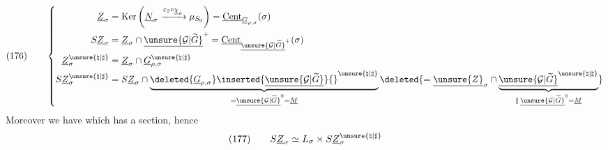\[
(176)\qquad
\left\{
\begin{aligned}
\underline Z_\sigma
&=\operatorname{Ker}\left(
\underline N_\sigma\xrightarrow{\varepsilon_2\circ\underline\chi_\sigma}\mu_{S_0}
\right)
=\underline{\operatorname{Cent}}_{\underline G_{\rho,\sigma}}(\sigma)\\
S\underline Z_\sigma
&=\underline Z_\sigma\cap\underline{\unsure{\mathcal G|\widetilde G}}^{+}
=\underline{\operatorname{Cent}}_{\underline{\unsure{\mathcal G|\widetilde G}}^{+}}(\sigma)\\
\underline Z_\sigma^{\unsure{\natural|\sharp}}
&=\underline Z_\sigma\cap\underline G_{\rho,\sigma}^{\unsure{\natural|\sharp}}\\
S\underline Z_\sigma^{\unsure{\natural|\sharp}}
&=S\underline Z_\sigma\cap
\underbrace{
\deleted{\underline G_{\rho,\sigma}}\inserted{\underline{\unsure{\mathcal G|\widetilde G}}}{}^{\unsure{\natural|\sharp}}
}_{=\underline{\unsure{\mathcal G|\widetilde G}}^0=\underline M}
\deleted{
=\underline{\unsure{Z}}_\sigma\cap
\underbrace{\underline{\unsure{\mathcal G|\widetilde G}}^{\unsure{\natural|\sharp}}}
_{\parallel\,\underline{\unsure{\mathcal G|\widetilde G}}^0=\underline M}
}
\end{aligned}
\right.
\]
Moreover we have
which has a section, hence
\[
(177)\qquad
S\underline Z_\sigma\simeq L_\sigma\times S\underline Z_\sigma^{\unsure{\natural|\sharp}}
\]



